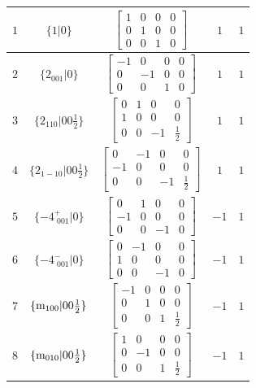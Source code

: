 \documentclass[fleqn,8pt]{jsarticle}
\begin{document}
\begin{longtable}{ccccc}
$ 1 $ & $ \{1|0\} $ & $ \begin{bmatrix} 1 & 0 & 0 & 0 \\ 0 & 1 & 0 & 0 \\ 0 & 0 & 1 & 0 \end{bmatrix} $ & $ 1 $ & $ 1 $ \\ \hline
$ 2 $ & $ \{2{}_{001}|0\} $ & $ \begin{bmatrix} -1 & 0 & 0 & 0 \\ 0 & -1 & 0 & 0 \\ 0 & 0 & 1 & 0 \end{bmatrix} $ & $ 1 $ & $ 1 $ \\ \hline
$ 3 $ & $ \{2{}_{110}|0 0 \frac{1}{2}\} $ & $ \begin{bmatrix} 0 & 1 & 0 & 0 \\ 1 & 0 & 0 & 0 \\ 0 & 0 & -1 & \frac{1}{2} \end{bmatrix} $ & $ 1 $ & $ 1 $ \\ \hline
$ 4 $ & $ \{2{}_{1-10}|0 0 \frac{1}{2}\} $ & $ \begin{bmatrix} 0 & -1 & 0 & 0 \\ -1 & 0 & 0 & 0 \\ 0 & 0 & -1 & \frac{1}{2} \end{bmatrix} $ & $ 1 $ & $ 1 $ \\ \hline
$ 5 $ & $ \{-4^{+}_{\,\,001}|0\} $ & $ \begin{bmatrix} 0 & 1 & 0 & 0 \\ -1 & 0 & 0 & 0 \\ 0 & 0 & -1 & 0 \end{bmatrix} $ & $ -1 $ & $ 1 $ \\ \hline
$ 6 $ & $ \{-4^{-}_{\,\,001}|0\} $ & $ \begin{bmatrix} 0 & -1 & 0 & 0 \\ 1 & 0 & 0 & 0 \\ 0 & 0 & -1 & 0 \end{bmatrix} $ & $ -1 $ & $ 1 $ \\ \hline
$ 7 $ & $ \{{\rm m}_{100}|0 0 \frac{1}{2}\} $ & $ \begin{bmatrix} -1 & 0 & 0 & 0 \\ 0 & 1 & 0 & 0 \\ 0 & 0 & 1 & \frac{1}{2} \end{bmatrix} $ & $ -1 $ & $ 1 $ \\ \hline
$ 8 $ & $ \{{\rm m}_{010}|0 0 \frac{1}{2}\} $ & $ \begin{bmatrix} 1 & 0 & 0 & 0 \\ 0 & -1 & 0 & 0 \\ 0 & 0 & 1 & \frac{1}{2} \end{bmatrix} $ & $ -1 $ & $ 1 $ \\ \hline

\end{longtable}
\end{document}
